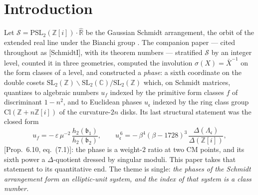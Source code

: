\documentclass[11pt]{amsart}
\numberwithin{equation}{section}
\theoremstyle{plain}
\theoremstyle{definition}
\theoremstyle{remark}
\newcommand{\C}{\mathbb{C}}
\newcommand{\R}{\mathbb{R}}
\newcommand{\Z}{\mathbb{Z}}
\newcommand{\Zi}{\Z[i]}
\newcommand{\Rhat}{\widehat{\R}}
\newcommand{\SL}{\mathrm{SL}}
\newcommand{\PSL}{\mathrm{PSL}}
\newcommand{\Cl}{\mathrm{Cl}}
\newcommand{\Sarr}{\mathcal{S}}
\newcommand{\idealb}{\mathfrak{b}}
\newcommand{\idealc}{\mathfrak{c}}
\newcommand{\eps}{\varepsilon}
\newcommand{\PaperI}{\cite{SchmidtI}}
\begin{document}
\begin{abstract}
character, with $h_{L_3} = 1, 1, 3, 2$ at the primitive levels $9, 11, 13,
23$, the last out of sample: the class number of the cubic field is the
Robert index of the Schmidt units.  Finally, the group of all ratios of the
$\Delta$-data has index $(4\cdot24^{h-1}/w)\,h_{H_n}\prod_\chi C_\chi(0)$ in the
unit group of the ring class field $H_n$ for every level --- a Dedekind
group determinant against the class number formula at $s = 0$ --- verified
with PARI/GP down to the exact exponent matrices, which show that modulo
$24$-th roots the index is exactly the class number times the
imprimitivity multipliers; the hyperbolic units have the analogous index
in the odd units of their class field, $24^6$ exactly at level $21$.  Every
finite claim is machine-verified;
the scripts and precision policies are catalogued in an appendix.
\end{abstract}

\maketitle
\tableofcontents

\section{Introduction}\label{sec:intro}

Let $\Sarr = \PSL_2(\Zi)\cdot\Rhat$ be the Gaussian Schmidt arrangement,
the orbit of the extended real line under the Bianchi group
\cite{Schmidt1975, StangeTAMS, StangeIMRN}.  The companion paper
\PaperI{} --- cited throughout as [SchmidtI], with its theorem numbers ---
stratified $\Sarr$ by an integer level, counted it in three geometries,
computed the involution $\sigma(X) = \bar X^{-1}$ on the form classes of a
level, and constructed a \emph{phase}: a sixth coordinate on the double
cosets $\SL_2(\Z)\backslash\SL_2(\C)/\SL_2(\Z)$ which, on Schmidt matrices,
quantizes to algebraic numbers $u_f$ indexed by the primitive form classes
$f$ of discriminant $1 - n^2$, and to Euclidean phases $u_\idealc$ indexed
by the ring class group $\Cl(\Z + n\Zi)$ of the curvature-$2n$ disks.  Its
last structural statement was the closed form
\[
  u_f = -\,\eps\,\mu^{-2}\,\frac{h_2(\idealb_1)}{h_2(\idealb_2)},
  \qquad
  u_\idealc^{\,6} = -\,\beta^4(\beta - 1728)^3\,
  \frac{\Delta(\Lambda_\idealc)}{\Delta(\Zi)},
\]
\PaperI[Prop.~6.10, eq.~(7.1)]: the phase is a weight-$2$ ratio at two CM
points, and its sixth power a $\Delta$-quotient dressed by singular moduli.
This paper takes that statement to its quantitative end.  The theme is
single: \emph{the phases of the Schmidt arrangement form an elliptic-unit
system, and the index of that system is a class number.}
\end{document}
